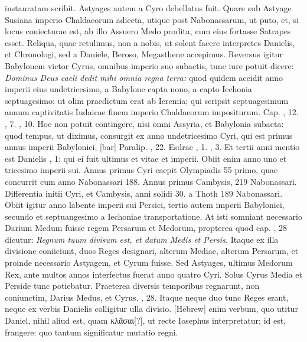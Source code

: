 instauratam scribit.
Astyages autem a Cyro debellatus fuit.
Quare sub Astyage Susiana imperio Chaldaeorum adiecta, utique
post Nabonassarum, ut puto, et, si locus coniecturae est, ab illo
Assuero Medo prodita, cum eius fortasse Satrapes esset.
Reliqua,
quae retulimus, non a nobis, ut solent facere interpretes Danielis,
et Chronologi, sed a Daniele, Beroso, Megasthene accepimus.
Reversus igitur Babylonem victor Cyrus, omnibus imperio suo
subactis, tunc iure potuit dicere: \textit{Dominus Deus caeli dedit mihi omnia
regna terra:} quod quidem accidit anno imperii eius undetricesimo,
a Babylone capta nono, a capto Iechonia septuagesimo: ut
olim praedictum erat ab Ieremia; qui scripsit septuagesimum annum
captivitatis Iudaicae finem imperio Chaldaeorum impositurum.
Cap. , 12. , 7. , 10.
Hoc non potuit contingere,
nisi omni Assyria, et Babylonia subacta: quod tempus,
ut diximus, consurgit ex anno undetricesimo Cyri, qui est primus
annus imperii Babylonici, [bar] Paralip. , 22.
Esdrae , 1.
, 3.
Et tertii anni mentio est Danielis , 1: qui ei fuit
 ultimus et
vitae et imperii.
Obiit enim anno uno et tricesimo imperii sui.
Annus primus Cyri caepit Olympiadis 55 primo, quae concurrit cum
anno Nabonassari 188.
Annus primus Cambysis, 219 Nabonassari.
Differentia initii Cyri, et Cambysis, anni solidi 30. a Thoth
189 Nabonassari.
Obiit igitur anno  labente imperii sui Persici,
tertio autem imperii Babylonici, secundo et septuangesimo a
Iechoniae transportatione.
At isti somniant necessario Darium Medum
fuisse regem Persarum et Medorum, propterea quod cap. ,
28 dicutur: \textit{Regnum tuum divisum est, et datum Medis et Persis.}
Itaque ex illa divisione coniiciunt, duos Reges designari, alterum
Mediae, alterum Persarum, et proinde necessario Astyagem, et
Cyrum fuisse.
Sed Astyages, ultimus Medorum Rex, ante multos
annos interfectus fuerat anno quatro Cyri.
Solus Cyrus Media et
Perside tunc potiebatur.
Praeterea diversis temporibus regnarunt,
non coniunctim, Darius Medus, et Cyrus. , 28.
Itaque neque
duo tunc Reges erant, neque ex verbis Danielis colligitur ulla divisio.
%
\texthebrew{}[Hebrew] enim verbum, quo utitur Daniel,
 nihil aliud est, quam
\textgreek{κλᾶσαι[?]}, ut recte Iosephus interpretatur;
 id est, frangere: quo tantum
significatur mutatio regni.
